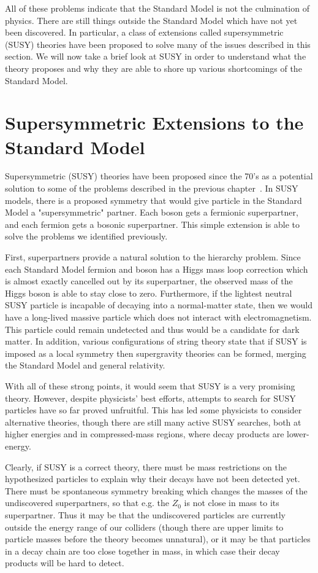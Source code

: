 All of these problems indicate that the Standard Model is not the culmination of physics. There are still things outside the Standard Model which have not yet been discovered. In particular, a class of extensions called supersymmetric (SUSY) theories have been proposed to solve many of the issues described in this section. We will now take a brief look at SUSY in order to understand what the theory proposes and why they are able to shore up various shortcomings of the Standard Model.

\section{Supersymmetric Extensions to the Standard Model}

Supersymmetric (SUSY) theories have been proposed since the 70's as a potential solution to some of the problems described in the previous chapter~\cite{SUSY_primer}. In SUSY models, there is a proposed symmetry that would give particle in the Standard Model a "supersymmetric" partner. Each boson gets a fermionic superpartner, and each fermion gets a bosonic superpartner. This simple extension is able to solve the problems we identified previously.

First, superpartners provide a natural solution to the hierarchy problem. Since each Standard Model fermion and boson has a Higgs mass loop correction which is almost exactly cancelled out by its superpartner, the observed mass of the Higgs boson is able to stay close to zero. Furthermore, if the lightest neutral SUSY particle is incapable of decaying into a normal-matter state, then we would have a long-lived massive particle which does not interact with electromagnetism. This particle could remain undetected and thus would be a candidate for dark matter. In addition, various configurations of string theory state that if SUSY is imposed as a local symmetry then supergravity theories can be formed, merging the Standard Model and general relativity.

With all of these strong points, it would seem that SUSY is a very promising theory. However, despite physicists' best efforts, attempts to search for SUSY particles have so far proved unfruitful. This has led some physicists to consider alternative theories, though there are still many active SUSY searches, both at higher energies and in compressed-mass regions, where decay products are lower-energy.

Clearly, if SUSY is a correct theory, there must be mass restrictions on the hypothesized particles to explain why their decays have not been detected yet. There must be spontaneous symmetry breaking which changes the masses of the undiscovered superpartners, so that e.g. the \textbf{$Z_0$} is not close in mass to its superpartner. Thus it may be that the undiscovered particles are currently outside the energy range of our colliders (though there are upper limits to particle masses before the theory becomes unnatural), or it may be that particles in a decay chain are too close together in mass, in which case their decay products will be hard to detect.


